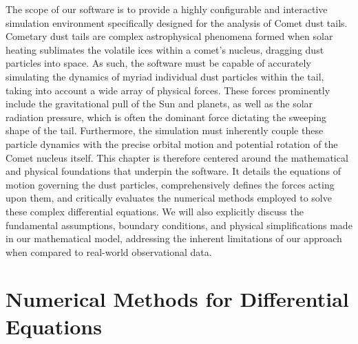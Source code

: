 The scope of our software is to provide a highly configurable and interactive simulation environment specifically designed for the analysis of Comet dust tails. Cometary dust tails are complex astrophysical phenomena formed when solar heating sublimates the volatile ices within a comet's nucleus, dragging dust particles into space. 
As such, the software must be capable of accurately simulating the dynamics of myriad individual dust particles within the tail, taking into account a wide array of physical forces. These forces prominently include the gravitational pull of the Sun and planets, as well as the solar radiation pressure, which is often the dominant force dictating the sweeping shape of the tail. Furthermore, the simulation must inherently couple these particle dynamics with the precise orbital motion and potential rotation of the Comet nucleus itself.
This chapter is therefore centered around the mathematical and physical foundations that underpin the software. It details the equations of motion governing the dust particles, comprehensively defines the forces acting upon them, and critically evaluates the numerical methods employed to solve these complex differential equations. We will also explicitly discuss the fundamental assumptions, boundary conditions, and physical simplifications made in our mathematical model, addressing the inherent limitations of our approach when compared to real-world observational data.

\section{Numerical Methods for Differential Equations}

